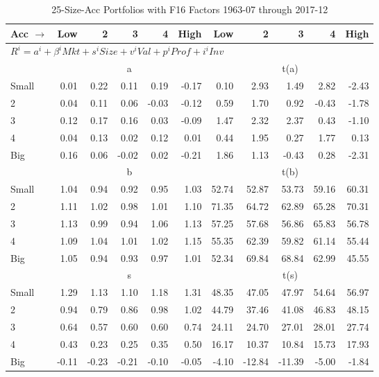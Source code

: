 
\begin{table}[!ht]
\footnotesize
\centering
\caption{25-Size-Acc Portfolios with F16 Factors 1963-07 through 2017-12}
\begin{tabular}{lrrrrrrrrrr}
  \toprule
    
    Acc $\rightarrow$ & Low & 2 & 3 & 4 & High & Low & 2 & 3 & 4 & High  \\ 
  \midrule
  \multicolumn{11}{l}{$R^i=a^i+\beta^iMkt+s^iSize+v^iVal+p^iProf+i^iInv$}  \\
  
     & \multicolumn{5}{c}{a} & \multicolumn{5}{c}{t(a)}   \\
     \cmidrule(r){2-6} \cmidrule(r){7-11} 
    Small  & 0.01  & 0.22  & 0.11  & 0.19  & -0.17  & 0.10  & 2.93  & 1.49  & 2.82  & -2.43   \\
    2  & 0.04  & 0.11  & 0.06  & -0.03  & -0.12  & 0.59  & 1.70  & 0.92  & -0.43  & -1.78   \\
    3  & 0.12  & 0.17  & 0.16  & 0.03  & -0.09  & 1.47  & 2.32  & 2.37  & 0.43  & -1.10   \\
    4  & 0.04  & 0.13  & 0.02  & 0.12  & 0.01  & 0.44  & 1.95  & 0.27  & 1.77  & 0.13   \\
    Big  & 0.16  & 0.06  & -0.02  & 0.02  & -0.21  & 1.86  & 1.13  & -0.43  & 0.28  & -2.31   \\
    
  
     & \multicolumn{5}{c}{b} & \multicolumn{5}{c}{t(b)}   \\
     \cmidrule(r){2-6} \cmidrule(r){7-11} 
    Small  & 1.04  & 0.94  & 0.92  & 0.95  & 1.03  & 52.74  & 52.87  & 53.73  & 59.16  & 60.31   \\
    2  & 1.11  & 1.02  & 0.98  & 1.01  & 1.10  & 71.35  & 64.72  & 62.89  & 65.28  & 70.31   \\
    3  & 1.13  & 0.99  & 0.94  & 1.06  & 1.13  & 57.25  & 57.68  & 56.86  & 65.83  & 56.78   \\
    4  & 1.09  & 1.04  & 1.01  & 1.02  & 1.15  & 55.35  & 62.39  & 59.82  & 61.14  & 55.44   \\
    Big  & 1.05  & 0.94  & 0.93  & 0.97  & 1.01  & 52.34  & 69.84  & 68.84  & 62.99  & 45.55   \\
    
  
     & \multicolumn{5}{c}{s} & \multicolumn{5}{c}{t(s)}   \\
     \cmidrule(r){2-6} \cmidrule(r){7-11} 
    Small  & 1.29  & 1.13  & 1.10  & 1.18  & 1.31  & 48.35  & 47.05  & 47.97  & 54.64  & 56.97   \\
    2  & 0.94  & 0.79  & 0.86  & 0.98  & 1.02  & 44.79  & 37.46  & 41.08  & 46.83  & 48.15   \\
    3  & 0.64  & 0.57  & 0.60  & 0.60  & 0.74  & 24.11  & 24.70  & 27.01  & 28.01  & 27.74   \\
    4  & 0.43  & 0.23  & 0.25  & 0.35  & 0.50  & 16.17  & 10.37  & 10.84  & 15.73  & 17.93   \\
    Big  & -0.11  & -0.23  & -0.21  & -0.10  & -0.05  & -4.10  & -12.84  & -11.39  & -5.00  & -1.84   \\
    

\end{tabular}
\end{table}
